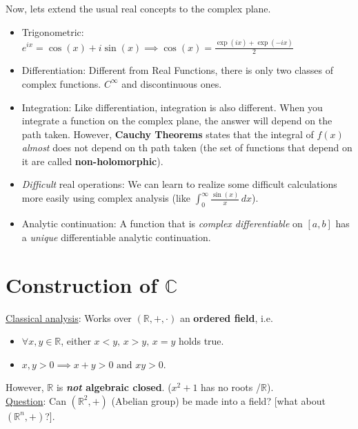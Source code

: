 \documentclass[english, a4paper,12pt]{Iart}
\theoremstyle{plain} %
\theoremstyle{remark}
\theoremstyle{definition}
\begin{document}
Now, lets extend the usual real concepts to the complex plane.

\begin{itemize}
    \item Trigonometric: $e^{ix} = \cos(x) + i\sin(x) \implies \cos(x) = \frac{\exp(ix) + \exp(-ix)}{2}$
    \item Differentiation: Different from Real Functions, there is only two classes of complex functions. $C^\infty$ and discontinuous ones.
    \item Integration: Like differentiation, integration is also different. When you integrate a function on the complex plane, the answer will depend on the path taken. However, \textbf{Cauchy Theorems} states that the integral of $f(x)$ \textit{almost} does not depend on th path taken (the set of functions that depend on it are called \textbf{non-holomorphic}).
    \item \textit{Difficult} real operations: We can learn to realize some difficult calculations more easily using complex analysis (like $\int^\infty_0 \frac{\sin(x)}{x} \, dx$).
    \item Analytic continuation:  A function that is \textit{complex differentiable} on $[a, b]$ has a \textit{unique} differentiable analytic continuation.
\end{itemize}

\section{Construction of $\mathbb{C}$}
\underline{Classical analysis}: Works over $(\mathbb{R}, +, \cdot)$ an \textbf{ordered field}, i.e.
\begin{itemize}
    \item $\forall x, y \in \mathbb{R}$, either $x < y,\,x > y,\,x=y$ holds true.\\
    \item $x, y > 0 \implies x+y > 0 \text{ and } xy > 0$.
\end{itemize}
However, $\mathbb{R}$ is \textbf{\textit{not} algebraic closed}. ($x^2 + 1$ has no roots /$\mathbb{R}$).\\

\underline{Question}: Can $(\mathbb{R}^2, +)$ (Abelian group) be made into a field? [what about $(\mathbb{R}^n, +)$?].\\
\end{document}
